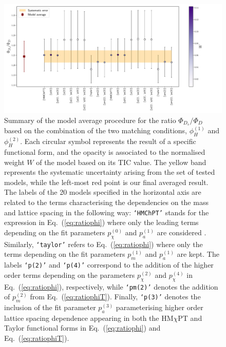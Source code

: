\begin{figure}[!t]
	\centering
	\includegraphics[scale=0.4]{./cap6/figs/fds/cat_ave_totfds_over_fd.pdf}
	\caption{Summary of the model average procedure for the ratio $\Phi_{D_s}/\Phi_D$ based on the combination of the two matching conditions, $\phi_{H}^{(1)}$ and $\phi_{H}^{(2)}$. Each circular symbol  represents the result of a specific functional form, and the opacity is associated to the normalised weight $W$ of the model based on its TIC value. The yellow band represents the systematic uncertainty arising from the set of tested models, while the left-most red point is our final  averaged result. The labels of the 20 models specified in the horizontal axis are related to the terms characterising the dependencies on the mass and lattice spacing in the following way:  \texttt{`HMChPT'}  stands for the expression in Eq.~(\ref{eq:ratiophi}) where only the leading terms depending on the fit parameters $p_\chi^{(0)}$ and $p_a^{(1)}$ are considered . Similarly,  \texttt{`taylor'} refers to Eq.~(\ref{eq:ratiophi}) where only the terms depending on the fit parameters $p_m^{(1)}$ and $p_a^{(1)}$ are kept. The labels \texttt{`p(2)'} and \texttt{`p(4)'} correspond to the addition of the higher order terms depending on the parameters $p_\chi^{(2)}$ and   $p_\chi^{(4)}$ in Eq.~(\ref{eq:ratiophi}), respectively, while  \texttt{`pm(2)'} denotes the addition of $p_m^{(2)}$ from Eq.~(\ref{eq:ratiophiT}). Finally,  \texttt{`p(3)'}  denotes the inclusion of the fit parameter $p_a^{(3)}$ parameterising  higher order  lattice spacing dependence appearing in both the HM$\chi$PT and Taylor functional forms in Eq.~(\ref{eq:ratiophi}) and Eq.~(\ref{eq:ratiophiT}).
        } 
	\label{fig:fds_ratio_model_av}
\end{figure}

